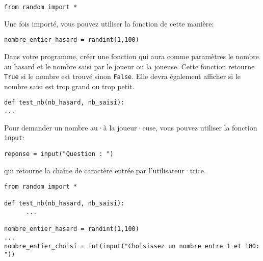 \documentclass[a4paper,12pt]{article}
\begin{document}
\begin{lstlisting}
from random import *
\end{lstlisting}
Une fois importé, vous pouvez utiliser la fonction de cette manière:
\begin{lstlisting}
nombre_entier_hasard = randint(1,100)
\end{lstlisting}

\hfill
	
	\vspace{4pt}
		

Dans votre programme, créer une fonction qui aura comme paramètres le nombre au hasard et le nombre saisi par le joueur ou la joueuse. Cette fonction retourne \lstinline{True} si le nombre est trouvé sinon \lstinline{False}. Elle devra également afficher si le nombre saisi est trop grand ou trop petit. 
\begin{lstlisting}
def test_nb(nb_hasard, nb_saisi):
...
\end{lstlisting}
\hfill
	
	\vspace{4pt}
		
Pour demander un nombre au·à la joueur·euse, vous pouvez utiliser la fonction \lstinline{input}:
\begin{lstlisting}
reponse = input("Question : ") 
\end{lstlisting}
qui retourne la chaîne de caractère entrée par l'utilisateur·trice.
\begin{lstlisting}
from random import *

def test_nb(nb_hasard, nb_saisi):
      ...
      
nombre_entier_hasard = randint(1,100)
...
nombre_entier_choisi = int(input("Choisissez un nombre entre 1 et 100: "))
\end{lstlisting}
\end{document}
